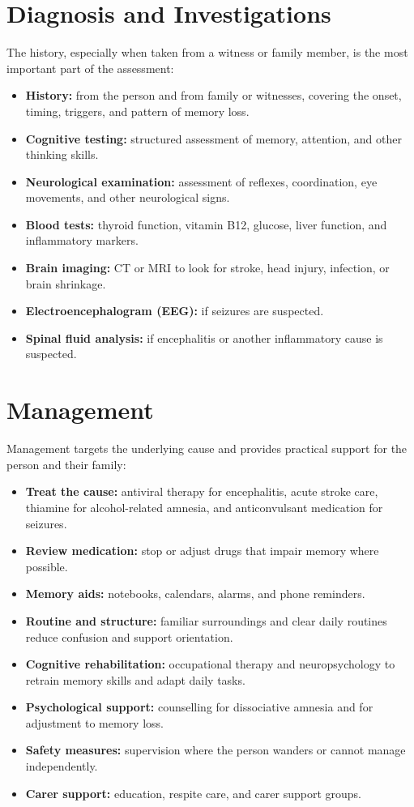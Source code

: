 \section*{Diagnosis and Investigations}
The history, especially when taken from a witness or family member, is the most important part of the assessment:

\begin{itemize}
    \item \textbf{History:} from the person and from family or witnesses, covering the onset, timing, triggers, and pattern of memory loss.
    \item \textbf{Cognitive testing:} structured assessment of memory, attention, and other thinking skills.
    \item \textbf{Neurological examination:} assessment of reflexes, coordination, eye movements, and other neurological signs.
    \item \textbf{Blood tests:} thyroid function, vitamin B12, glucose, liver function, and inflammatory markers.
    \item \textbf{Brain imaging:} CT or MRI to look for stroke, head injury, infection, or brain shrinkage.
    \item \textbf{Electroencephalogram (EEG):} if seizures are suspected.
    \item \textbf{Spinal fluid analysis:} if encephalitis or another inflammatory cause is suspected.
\end{itemize}

\section*{Management}
Management targets the underlying cause and provides practical support for the person and their family:

\begin{itemize}
    \item \textbf{Treat the cause:} antiviral therapy for encephalitis, acute stroke care, thiamine for alcohol-related amnesia, and anticonvulsant medication for seizures.
    \item \textbf{Review medication:} stop or adjust drugs that impair memory where possible.
    \item \textbf{Memory aids:} notebooks, calendars, alarms, and phone reminders.
    \item \textbf{Routine and structure:} familiar surroundings and clear daily routines reduce confusion and support orientation.
    \item \textbf{Cognitive rehabilitation:} occupational therapy and neuropsychology to retrain memory skills and adapt daily tasks.
    \item \textbf{Psychological support:} counselling for dissociative amnesia and for adjustment to memory loss.
    \item \textbf{Safety measures:} supervision where the person wanders or cannot manage independently.
    \item \textbf{Carer support:} education, respite care, and carer support groups.
\end{itemize}

